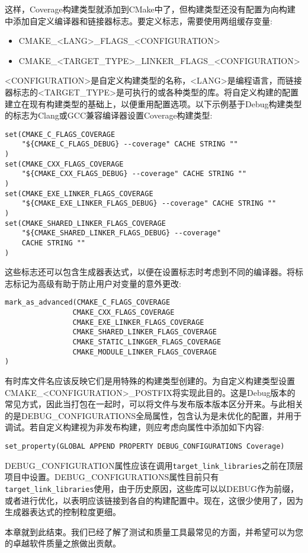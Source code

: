 这样，Coverage构建类型就添加到CMake中了，但构建类型还没有配置为向构建中添加自定义编译器和链接器标志。要定义标志，需要使用两组缓存变量:

\begin{itemize}
\item 
CMAKE\_<LANG>\_FLAGS\_<CONFIGURATION>

\item 
CMAKE\_<TARGET\_TYPE>\_LINKER\_FLAGS\_<CONFIGURATION>
\end{itemize}

<CONFIGURATION>是自定义构建类型的名称，<LANG>是编程语言，而链接器标志的<TARGET\_TYPE>是可执行的或各种类型的库。将自定义构建的配置建立在现有构建类型的基础上，以便重用配置选项。以下示例基于Debug构建类型的标志为Clang或GCC兼容编译器设置Coverage构建类型:

\begin{lstlisting}[style=styleCMake]
set(CMAKE_C_FLAGS_COVERAGE
	"${CMAKE_C_FLAGS_DEBUG} --coverage" CACHE STRING ""
)
set(CMAKE_CXX_FLAGS_COVERAGE
	"${CMAKE_CXX_FLAGS_DEBUG} --coverage" CACHE STRING ""
)
set(CMAKE_EXE_LINKER_FLAGS_COVERAGE
	"${CMAKE_EXE_LINKER_FLAGS_DEBUG} --coverage" CACHE STRING ""
)
set(CMAKE_SHARED_LINKER_FLAGS_COVERAGE
	"${CMAKE_SHARED_LINKER_FLAGS_DEBUG} --coverage"
	CACHE STRING ""
)
\end{lstlisting}

这些标志还可以包含生成器表达式，以便在设置标志时考虑到不同的编译器。将标志标记为高级有助于防止用户对变量的意外更改:

\begin{lstlisting}[style=styleCMake]
mark_as_advanced(CMAKE_C_FLAGS_COVERAGE
				CMAKE_CXX_FLAGS_COVERAGE
				CMAKE_EXE_LINKER_FLAGS_COVERAGE
				CMAKE_SHARED_LINKER_FLAGS_COVERAGE
				CMAKE_STATIC_LINKGER_FLAGS_COVERAGE
				CMAKE_MODULE_LINKER_FLAGS_COVERAGE
)
\end{lstlisting}

有时库文件名应该反映它们是用特殊的构建类型创建的。为自定义构建类型设置CMAKE\_<CONFIGURATION>\_POSTFIX将实现此目的。这是Debug版本的常见方式，因此当打包在一起时，可以将文件与发布版本版本区分开来。与此相关的是DEBUG\_CONFIGURATIONS全局属性，包含认为是未优化的配置，并用于调试。若自定义构建视为非发布构建，则应考虑向属性中添加如下内容:

\begin{lstlisting}[style=styleCMake]
set_property(GLOBAL APPEND PROPERTY DEBUG_CONFIGURATIONS Coverage)
\end{lstlisting}

DEBUG\_CONFIGURATION属性应该在调用\texttt{target\_link\_libraries}之前在顶层项目中设置。DEBUG\_CONFIGURATIONS属性目前只有\texttt{target\_link\_libraries}使用，由于历史原因，这些库可以以DEBUG作为前缀，或者进行优化，以表明应该链接到各自的构建配置中。现在，这很少使用了，因为生成器表达式的控制粒度更细。

本章就到此结束。我们已经了解了测试和质量工具最常见的方面，并希望可以为您的卓越软件质量之旅做出贡献。













